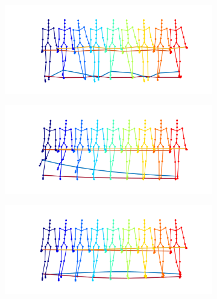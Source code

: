 \documentclass[letterpaper]{article} %
\begin{document}
\begin{figure}[ht]

\centering
\begin{subfigure}[b]{0.62\columnwidth}
  \centering
	{\includegraphics[width=0.99\columnwidth]{gaitTransOpt_1.png}}
  \caption{}
	\label{subfig:inputGait1}
\end{subfigure}
\begin{subfigure}[b]{0.62\columnwidth}
  \centering
	{\includegraphics[width=0.99\columnwidth]{gaitTransOpt_2.png}}
  \caption{}
	\label{subfig:inputGait2}
\end{subfigure}
\begin{subfigure}[b]{0.62\columnwidth}
  \centering
	\includegraphics[width=0.99\columnwidth]{gaitTransOpt_4.png}
	\caption{}
	\label{subfig:inputGait4}
\end{subfigure}
\begin{subfigure}[b]{0.62\columnwidth}

\end{subfigure}
\end{figure}
\end{document}
